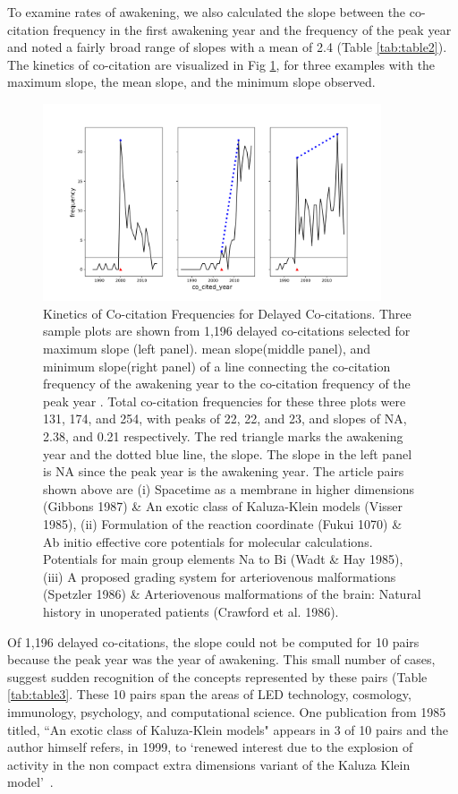 \documentclass[utf8]{frontiersSCNS}
\begin{document}
To examine rates of awakening, we also calculated the slope between the co-citation frequency in the first awakening year and the frequency of the peak year and noted a fairly broad range of slopes with a mean of 2.4 (Table \ref{tab:table2}). The kinetics of co-citation are visualized in Fig \ref{fig:fig2}, for three examples with the maximum slope, the mean slope, and the minimum slope observed.  
\begin{figure}[h!]
\begin{center}
\includegraphics[width=10cm]{fig3.png}%
\end{center}
\caption{Kinetics of Co-citation Frequencies for Delayed Co-citations. Three sample plots are shown from 1,196 delayed co-citations selected for maximum slope (left panel). mean slope(middle panel), and minimum slope(right panel) of a line connecting the co-citation frequency of the awakening year to the co-citation frequency of the peak year . Total co-citation frequencies for these three plots were 131, 174, and 254, with peaks of 22, 22, and 23, and slopes of NA, 2.38, and 0.21 respectively. The red triangle marks the awakening year and the dotted blue line, the slope. The slope in the left panel is NA since the peak year is the awakening year. The article pairs shown above are (i) Spacetime as a membrane in higher dimensions (Gibbons 1987) \& An exotic class of Kaluza-Klein models (Visser 1985), (ii) Formulation of the reaction coordinate (Fukui 1070) \& Ab initio effective core potentials for molecular calculations. Potentials for main group elements Na to Bi (Wadt \& Hay 1985), (iii) A proposed grading system for arteriovenous malformations (Spetzler 1986) \& Arteriovenous malformations of the brain: Natural history in unoperated patients (Crawford et al. 1986).}
\label{fig:fig2}
\end{figure}

Of 1,196 delayed co-citations, the slope could not be computed for 10 pairs because the peak year was the year of awakening. This small number of cases, suggest sudden recognition of the concepts represented by these pairs (Table \ref{tab:table3}. These 10 pairs span the areas of LED technology, cosmology, immunology, psychology, and computational science. One publication from 1985 titled, ``An exotic class of Kaluza-Klein models" appears in 3 of 10 pairs and the author himself refers, in 1999, to `renewed interest due to the explosion of activity in the non compact extra dimensions variant of the Kaluza Klein model'~\citep{visser_1999}.
\end{document}
